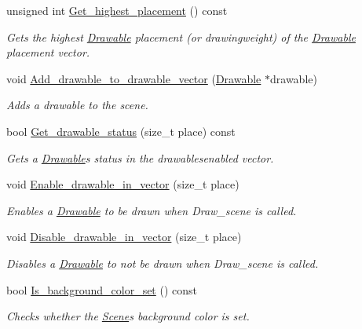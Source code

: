 \begin{DoxyCompactItemize}
unsigned int \hyperlink{classjetfuel_1_1draw_1_1Scene_a439de5e14d13f06db5acd2da708dc177}{Get\+\_\+highest\+\_\+placement} () const
\begin{DoxyCompactList}\small\item\em Gets the highest \hyperlink{classjetfuel_1_1draw_1_1Drawable}{Drawable} placement (or drawingweight) of the \hyperlink{classjetfuel_1_1draw_1_1Drawable}{Drawable} placement vector. \end{DoxyCompactList}\item 
void \hyperlink{classjetfuel_1_1draw_1_1Scene_a58984e589bd7ffa2940299fa88388765}{Add\+\_\+drawable\+\_\+to\+\_\+drawable\+\_\+vector} (\hyperlink{classjetfuel_1_1draw_1_1Drawable}{Drawable} $\ast$drawable)
\begin{DoxyCompactList}\small\item\em Adds a drawable to the scene. \end{DoxyCompactList}\item 
bool \hyperlink{classjetfuel_1_1draw_1_1Scene_a7442f49028075ad2da9d3c2e450fbe4d}{Get\+\_\+drawable\+\_\+status} (size\+\_\+t place) const
\begin{DoxyCompactList}\small\item\em Gets a \hyperlink{classjetfuel_1_1draw_1_1Drawable}{Drawable}\textquotesingle{}s status in the drawablesenabled vector. \end{DoxyCompactList}\item 
void \hyperlink{classjetfuel_1_1draw_1_1Scene_a517687bb7b400a9e0b82c4c53e1939cc}{Enable\+\_\+drawable\+\_\+in\+\_\+vector} (size\+\_\+t place)
\begin{DoxyCompactList}\small\item\em Enables a \hyperlink{classjetfuel_1_1draw_1_1Drawable}{Drawable} to be drawn when Draw\+\_\+scene is called. \end{DoxyCompactList}\item 
void \hyperlink{classjetfuel_1_1draw_1_1Scene_a725618dfecbdb201fba44be02cc2bc13}{Disable\+\_\+drawable\+\_\+in\+\_\+vector} (size\+\_\+t place)
\begin{DoxyCompactList}\small\item\em Disables a \hyperlink{classjetfuel_1_1draw_1_1Drawable}{Drawable} to not be drawn when Draw\+\_\+scene is called. \end{DoxyCompactList}\item 
bool \hyperlink{classjetfuel_1_1draw_1_1Scene_a1d8d53f33a18643e5ee7ea05e9906786}{Is\+\_\+background\+\_\+color\+\_\+set} () const
\begin{DoxyCompactList}\small\item\em Checks whether the \hyperlink{classjetfuel_1_1draw_1_1Scene}{Scene}\textquotesingle{}s background color is set. \end{DoxyCompactList}\end{DoxyCompactItemize}


